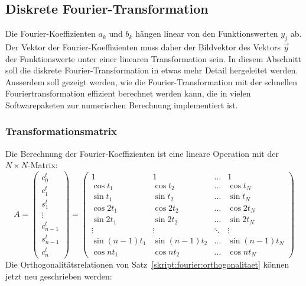 \subsection{Diskrete Fourier-Transformation}
Die Fourier-Koeffizienten $a_k$ und $b_k$ hängen linear von den
Funktionswerten $y_j$ ab.
Der Vektor der Fourier-Koeffizienten muss daher der Bildvektor des
Vektors $\vec y$ der Funktionswerte unter einer linearen Transformation
sein.
In diesem Abschnitt soll die diskrete Fourier-Transformation in etwas
mehr Detail hergeleitet werden.
Ausserdem soll gezeigt werden, wie die Fourier-Transformation
mit der schnellen Fouriertransformation
effizient berechnet werden kann, die in vielen Softwarepaketen zur
numerischen Berechnung implementiert ist.

\subsubsection{Transformationsmatrix}
Die Berechnung der Fourier-Koeffizienten ist eine lineare Operation
mit der $N\times N$-Matrix:
\[
A
=
\begin{pmatrix}
c_0^t\\
c_1^t\\
s_1^t\\
\vdots\\
c_{n-1}^t\\
s_{n-1}^t\\
c_n^t
\end{pmatrix}
=
\begin{pmatrix}
1           &1           &\dots &1            \\
\cos t_1    &\cos t_2    &\dots &\cos t_N     \\
\sin t_1    &\sin t_2    &\dots &\sin t_N     \\
\cos 2t_1   &\cos 2t_2   &\dots &\cos 2t_N    \\
\sin 2t_1   &\sin 2t_2   &\dots &\sin 2t_N    \\
\vdots      &\vdots      &\ddots&\vdots       \\
\sin(n-1)t_1&\sin(n-1)t_2&\dots &\sin(n-1)t_N \\
\cos nt_1   &\cos nt_2   &\dots &\cos nt_N    
\end{pmatrix}
\]
Die Orthogonalitätsrelationen von
Satz~\ref{skript:fourier:orthogonalitaet}
können jetzt neu geschrieben werden:
